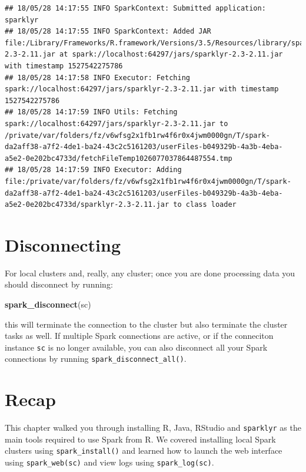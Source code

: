 \documentclass[]{book}
\newenvironment{Shaded}{\begin{snugshade}}{\end{snugshade}}
\newcommand{\KeywordTok}[1]{\textcolor[rgb]{0.13,0.29,0.53}{\textbf{#1}}}
\newcommand{\NormalTok}[1]{#1}
\theoremstyle{definition}
\theoremstyle{definition}
\theoremstyle{definition}
\theoremstyle{remark}
\begin{document}
\begin{verbatim}
## 18/05/28 14:17:55 INFO SparkContext: Submitted application: sparklyr
## 18/05/28 14:17:55 INFO SparkContext: Added JAR file:/Library/Frameworks/R.framework/Versions/3.5/Resources/library/sparklyr/java/sparklyr-2.3-2.11.jar at spark://localhost:64297/jars/sparklyr-2.3-2.11.jar with timestamp 1527542275786
## 18/05/28 14:17:58 INFO Executor: Fetching spark://localhost:64297/jars/sparklyr-2.3-2.11.jar with timestamp 1527542275786
## 18/05/28 14:17:59 INFO Utils: Fetching spark://localhost:64297/jars/sparklyr-2.3-2.11.jar to /private/var/folders/fz/v6wfsg2x1fb1rw4f6r0x4jwm0000gn/T/spark-da2aff38-a7f2-4de1-ba24-43c2c5161203/userFiles-b049329b-4a3b-4eba-a5e2-0e202bc4733d/fetchFileTemp1026077037864487554.tmp
## 18/05/28 14:17:59 INFO Executor: Adding file:/private/var/folders/fz/v6wfsg2x1fb1rw4f6r0x4jwm0000gn/T/spark-da2aff38-a7f2-4de1-ba24-43c2c5161203/userFiles-b049329b-4a3b-4eba-a5e2-0e202bc4733d/sparklyr-2.3-2.11.jar to class loader
\end{verbatim}

\hypertarget{disconnecting}{%
\section{Disconnecting}\label{disconnecting}}

For local clusters and, really, any cluster; once you are done
processing data you should disconnect by running:

\begin{Shaded}
\begin{Highlighting}[]
\KeywordTok{spark_disconnect}\NormalTok{(sc)}
\end{Highlighting}
\end{Shaded}

this will terminate the connection to the cluster but also terminate the
cluster tasks as well. If multiple Spark connections are active, or if
the conneciton instance \texttt{sc} is no longer available, you can also
disconnect all your Spark connections by running
\texttt{spark\_disconnect\_all()}.

\hypertarget{recap}{%
\section{Recap}\label{recap}}

This chapter walked you through installing R, Java, RStudio and
\texttt{sparklyr} as the main tools required to use Spark from R. We
covered installing local Spark clusters using \texttt{spark\_install()}
and learned how to launch the web interface using
\texttt{spark\_web(sc)} and view logs using \texttt{spark\_log(sc)}.
\end{document}
